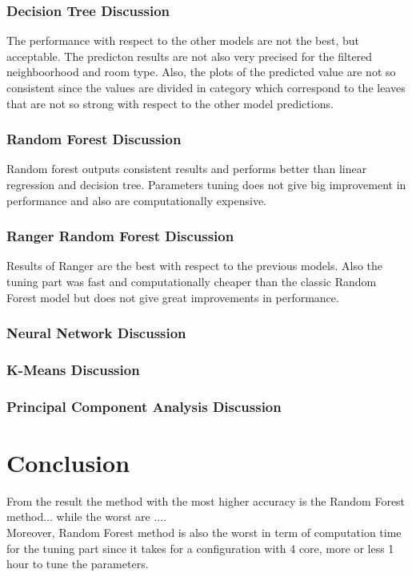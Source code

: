 \documentclass{FR16}
\begin{document}
\subsubsection{Decision Tree Discussion}
The performance with respect to the other models are not the best, but acceptable. The predicton results are not also very precised for the filtered neighboorhood 
and room type. Also, the plots of the predicted value are not so consistent since the values are divided in category which correspond to the leaves that are not so strong
with respect to the other model predictions.
\\

\subsubsection{Random Forest Discussion}
Random forest outputs consistent results and performs  better than linear regression and decision tree. 
Parameters tuning does not give big improvement in performance and also are computationally expensive.
\\

\subsubsection{Ranger Random Forest Discussion}
Results of Ranger are the best with respect to the previous models. Also the tuning part was fast and computationally cheaper than 
the classic Random Forest model but does not give great improvements in performance.
\\
\subsubsection{Neural Network Discussion}
\subsubsection{K-Means Discussion}
\subsubsection{Principal Component Analysis Discussion}

\section{Conclusion}

From the result the method with the most higher accuracy is the Random Forest method... while the worst are ....
\\Moreover, Random Forest method is also the worst in term of computation time for the tuning part since it takes for a configuration with 4 core, more or less 1 hour to tune the parameters. 
\end{document}

